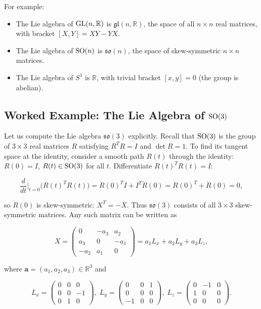 For example:
\begin{itemize}
    \item The Lie algebra of $\operatorname{GL}(n,\mathbb{R})$ is $\mathfrak{gl}(n,\mathbb{R})$, the space of all $n \times n$ real matrices, with bracket $[X,Y] = XY - YX$.
    \item The Lie algebra of $\operatorname{SO}(n)$ is $\mathfrak{so}(n)$, the space of skew-symmetric $n \times n$ matrices.
    \item The Lie algebra of $S^1$ is $\mathbb{R}$, with trivial bracket $[x,y] = 0$ (the group is abelian).
\end{itemize}

\subsection{Worked Example: The Lie Algebra of \texorpdfstring{$\operatorname{SO}(3)$}{SO(3)}}

Let us compute the Lie algebra $\mathfrak{so}(3)$ explicitly. Recall that $\operatorname{SO}(3)$ is the group of $3 \times 3$ real matrices $R$ satisfying $R^T R = I$ and $\det R = 1$. To find its tangent space at the identity, consider a smooth path $R(t)$ through the identity: $R(0) = I$, $R(t) \in \operatorname{SO}(3)$ for all $t$. Differentiate $R(t)^T R(t) = I$:

\[
\frac{d}{dt}\Big|_{t=0} \big(R(t)^T R(t)\big) = \dot R(0)^T I + I^T \dot R(0) = \dot R(0)^T + \dot R(0) = 0,
\]

so $\dot R(0)$ is skew-symmetric: $X^T = -X$. Thus $\mathfrak{so}(3)$ consists of all $3 \times 3$ skew-symmetric matrices. Any such matrix can be written as

\[
X = \begin{pmatrix}
0 & -a_3 & a_2 \\
a_3 & 0 & -a_1 \\
-a_2 & a_1 & 0
\end{pmatrix}
= a_1 L_x + a_2 L_y + a_3 L_z,
\]

where $\mathbf{a} = (a_1,a_2,a_3) \in \mathbb{R}^3$ and

\[
L_x = \begin{pmatrix} 0 & 0 & 0 \\ 0 & 0 & -1 \\ 0 & 1 & 0 \end{pmatrix},\;
L_y = \begin{pmatrix} 0 & 0 & 1 \\ 0 & 0 & 0 \\ -1 & 0 & 0 \end{pmatrix},\;
L_z = \begin{pmatrix} 0 & -1 & 0 \\ 1 & 0 & 0 \\ 0 & 0 & 0 \end{pmatrix}.
\]

